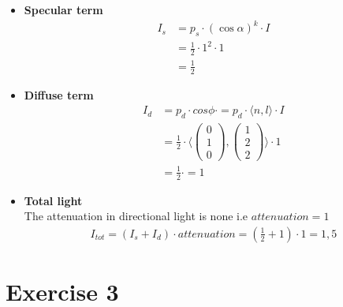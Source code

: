 \documentclass[tikz,14pt,fleqn]{article}
\begin{document}
\begin{itemize}
   \item \textbf{Specular term}\\
   
\begin{align*}
   I_s &= p_s \cdot(\cos{\alpha})^k \cdot I \\&= \frac{1}{2} \cdot 1^2 \cdot 1 \\&= \frac{1}{2}
\end{align*}
   \item \textbf{Diffuse term}
\begin{align*}
   I_d &= p_d \cdot cos{\phi} \cdot = p_d \cdot \langle n,l \rangle \cdot I
   \\&= \frac{1}{2} \cdot \langle \begin{pmatrix} 0\\1\\0\end{pmatrix},\begin{pmatrix} 1\\2\\2\end{pmatrix}\rangle \cdot 1
   \\&= \frac{1}{2} \cdot = 1
\end{align*}
   \item \textbf{Total light}\\
The attenuation in directional light is none i.e $attenuation = 1$
\begin{align*}
   I_{tot} = (I_s + I_d)\cdot attenuation = (\frac{1}{2} + 1) \cdot 1 = 1,5
\end{align*}
\end{itemize}





\newpage
\section{Exercise 3}
\end{document}
